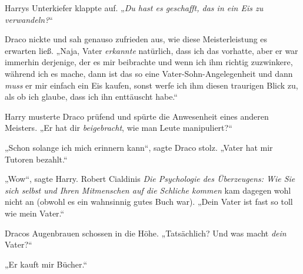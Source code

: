 Harrys Unterkiefer klappte auf. „\emph{Du hast es geschafft, \emph{das} in ein Eis zu verwandeln?}“

Draco nickte und sah genauso zufrieden aus, wie diese Meisterleistung es erwarten ließ. „Naja, Vater \emph{erkannte} natürlich, dass ich das vorhatte, aber er war immerhin derjenige, der es mir beibrachte und wenn ich ihm richtig zuzwinkere, während ich es mache, dann ist das so eine Vater-Sohn-Angelegenheit und dann \emph{muss} er mir einfach ein Eis kaufen, sonst werfe ich ihm diesen traurigen Blick zu, als ob ich glaube, dass ich ihn enttäuscht habe.“

Harry musterte Draco prüfend und spürte die Anwesenheit eines anderen Meisters. „Er hat dir \emph{beigebracht}, wie man Leute manipuliert?“

„Schon solange ich mich erinnern kann“, sagte Draco stolz. „Vater hat mir Tutoren bezahlt.“

„Wow“, sagte Harry. Robert Cialdinis \emph{Die Psychologie des Überzeugens: Wie Sie sich selbst und Ihren Mitmenschen auf die Schliche kommen} kam dagegen wohl nicht an (obwohl es ein wahnsinnig gutes Buch war). „Dein Vater ist fast so toll wie mein Vater.“

Dracos Augenbrauen schossen in die Höhe. „Tatsächlich? Und was macht \emph{dein} Vater?“

„Er kauft mir Bücher.“

